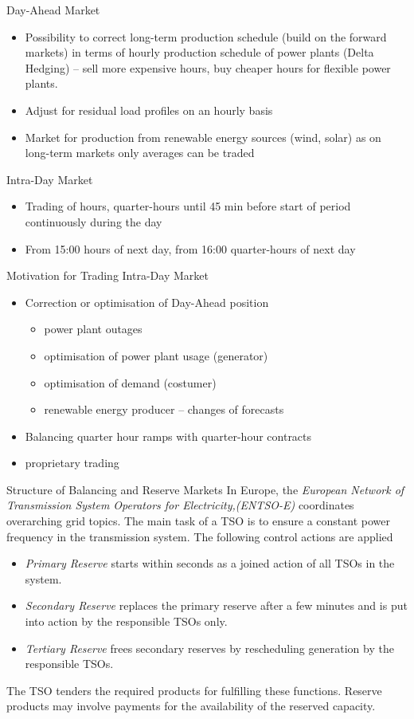 {Day-Ahead Market }
\begin{itemize}
\item<1-> Possibility to correct long-term production schedule  (build on the forward markets) in terms of hourly production schedule of power plants (Delta Hedging) -- sell more expensive hours, buy cheaper hours for flexible power plants.
\item<2-> Adjust for residual load profiles on an hourly basis
\item<3-> Market for production from renewable energy sources (wind, solar) as on long-term markets only averages can be traded
\end{itemize}

{Intra-Day Market }
\begin{itemize}
\item<1-> Trading of hours, quarter-hours until 45 min before start of period continuously during the day
\item<2-> From 15:00 hours of next day, from 16:00 quarter-hours of next day
\end{itemize}

{Motivation for Trading Intra-Day Market }
\begin{itemize}
\item<1-> Correction or optimisation of Day-Ahead position
\begin{itemize}
\item power plant outages
\item optimisation of power plant usage (generator)
\item optimisation of demand (costumer)
\item renewable energy producer -- changes of forecasts
\end{itemize}
\item<2-> Balancing quarter hour ramps with quarter-hour contracts
\item<3-> proprietary trading
\end{itemize}

{Structure of Balancing and Reserve Markets }
In Europe, the {\it European Network of Transmission System Operators for Electricity,(ENTSO-E)} coordinates overarching grid topics. The main task of a TSO is to ensure a constant power frequency in the transmission system. The following control actions are applied
\begin{itemize}
\item<1->{\it Primary Reserve}   starts within seconds as a joined action of all TSOs in the system.
\item<2-> {\it Secondary Reserve} replaces the primary reserve after a few minutes and is put into action by the responsible TSOs only.
\item<3->{\it Tertiary Reserve} frees secondary reserves by rescheduling generation by the responsible TSOs.
\end{itemize}
The TSO tenders the required products for fulfilling these functions. Reserve products may involve payments for the availability of the reserved capacity.

